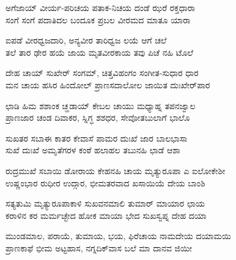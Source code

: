 
\begin{myquote}
ಅಗೆಜಾಯ್ ವೀರ್ಯ-ಪರಿಚಯ ಪತಾಕ-ನಿಚಯ ದಂಡೆ ಝರೆ ರಕ್ತಧಾರಾ\\ಸಂಗೆ ಸಂಗೆ ಪದಾತಿದಲ ಬಂದೂಕ ಪ್ರಬಲ ವೀರಮದ ಮಾತೂ ಯಾರಾ
\end{myquote}


\begin{myquote}
ಐಪಡೆ ವೀರಧ್ವಜದಾರಿ, ಅನ್ಯವೀರ ತಾರಿಧ್ವಜ ಲಯೆ ಆಗೆ ಚಲೆ\\ತಲೆ ತಾರ ಢೇರ ಹಯೆ ಜಾಯ ಮೃತವೀರಕಾಯ ತವು ಪಿಚೆ ನಹಿ ಟೊಲೆ
\end{myquote}


\begin{myquote}
ದೇಹ ಚಾಯ್ ಸುಖೇರ್ ಸಂಗಮ್, ಚಿತ್ತವಿಹಂಗಂ ಸಂಗೀತ-ಸುಧಾರ ಧಾರ\\ಮನ ಚಾಯ ಹಸಿರ ಹಿಂದೋಲ್ ಪ್ರಾಣಸದಾಲೋಲ ಜಾಯಿತ ದುಃಖೇರ್‌ಪಾರ
\end{myquote}


\begin{myquote}
ಛಾಡಿ ಹಿಮ ಶಶಾಂಕ ಚ್ಹಡಾಯ್ ಕೇಬಲ ಚಾಯು ಮಧ್ಯಾಹ್ನ ತಪನಜ್ವಾಲ\\ಪ್ರಾಣಜಾರ ಚಂಡ ದಿವಾಕರ, ಸ್ನಿಗ್ಧ ಶಶಧರ, ಸೇವೋತಬುಲಾಗೆ ಭಾಲೊ
\end{myquote}


\begin{myquote}
ಸುಖತರ ಸಬಾಈ ಕಾತರ ಕೇವಾಸೆ ಪಾಮರ ದುಃಖೆ ಜಾರ ಬಾಲಭಾಸಾ\\ಸುಖೆ ದುಃಖೆ ಅಮೃತೆಗರಳ ಕಂಠೆ ಹಲಾಹಲ ತಬುನಹಿ ಛಾಡೆ ಆಶಾ
\end{myquote}


\begin{myquote}
ರುದ್ರಮುಖೆ ಸಬಾಯಿ ಡೋರಾಯ ಕೇಹನಹಿ ಚಾಯ ಮೃತ್ಯುರೂಪಾ ಎ ಐಲೋಕೇಶೀ\\ಉಷ್ಣಂಭಾರ ರುಧೀರ ಉದ್ಗಾರ, ಭೀಮತರವಾದ ಖಸಾಯಿಯೆ ದೇಯ ಬಾಂಶಿ
\end{myquote}


\begin{myquote}
ಸತ್ಯತುಮಿ ಮೃತ್ಯುರೂಪಾಕಾಳಿ ಸುಖವನಮಾಲಿ ತುಮಾರ್‌ ಮಾಯಾರ ಛಾಯ\\ಕರಾಳಿನ ಕರ ಮರ್ಮಚ್ಛೇದ ಹೋಕ ಮಾಯಾ ಭೇದ ಸುಖಸ್ವಪ್ನ ದೇಹ ದಯಾ
\end{myquote}


\begin{myquote}
ಮುಂಡಮಾಲ, ಪರಾಯೆ, ತುಮಾಯ, ಭಯ, ಫಿರೆಚಾಯ ನಾಮದೇಯ ದಯಾಮಯಿ\\ಪ್ರಾಣಕಾಫೆ ಭೀಮ ಅಟ್ಟಹಾಸ, ನಗ್ನದಿಕ್‌ವಾಸ ಬಲೆ ಮಾ ದಾನವ ಜಿಯೀ
\end{myquote}

